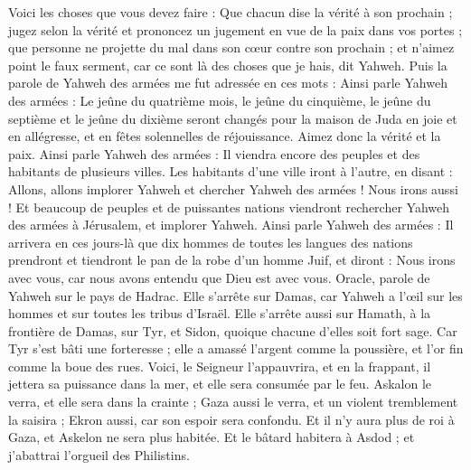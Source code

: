 \begin{multicols}{2}
Voici les choses que vous devez faire : Que chacun dise la vérité à son prochain ; jugez selon la vérité et prononcez un jugement en vue de la paix dans vos portes ;
que personne ne projette du mal dans son cœur contre son prochain ; et n'aimez point le faux serment, car ce sont là des choses que je hais, dit Yahweh.
Puis la parole de Yahweh des armées me fut adressée en ces mots :
Ainsi parle Yahweh des armées : Le jeûne du quatrième mois, le jeûne du cinquième, le jeûne du septième et le jeûne du dixième seront changés pour la maison de Juda en joie et en allégresse, et en fêtes solennelles de réjouissance. Aimez donc la vérité et la paix.
Ainsi parle Yahweh des armées : Il viendra encore des peuples et des habitants de plusieurs villes.
Les habitants d'une ville iront à l'autre, en disant : Allons, allons implorer Yahweh et chercher Yahweh des armées ! Nous irons aussi !
Et beaucoup de peuples et de puissantes nations viendront rechercher Yahweh des armées à Jérusalem, et implorer Yahweh.
Ainsi parle Yahweh des armées : Il arrivera en ces jours-là que dix hommes de toutes les langues des nations prendront et tiendront le pan de la robe d'un homme Juif, et diront : Nous irons avec vous, car nous avons entendu que Dieu est avec vous.
\VerseOne{}Oracle, parole de Yahweh sur le pays de Hadrac. Elle s'arrête sur Damas, car Yahweh a l'œil sur les hommes et sur toutes les tribus d'Israël.
Elle s'arrête aussi sur Hamath, à la frontière de Damas, sur Tyr, et Sidon, quoique chacune d'elles soit fort sage.
Car Tyr s'est bâti une forteresse ; elle a amassé l'argent comme la poussière, et l'or fin comme la boue des rues.
Voici, le Seigneur l'appauvrira, et en la frappant, il jettera sa puissance dans la mer, et elle sera consumée par le feu.
Askalon le verra, et elle sera dans la crainte ; Gaza aussi le verra, et un violent tremblement la saisira ; Ekron aussi, car son espoir sera confondu. Et il n'y aura plus de roi à Gaza, et Askelon ne sera plus habitée.
Et le bâtard habitera à Asdod ; et j'abattrai l'orgueil des Philistins.

\end{multicols}
